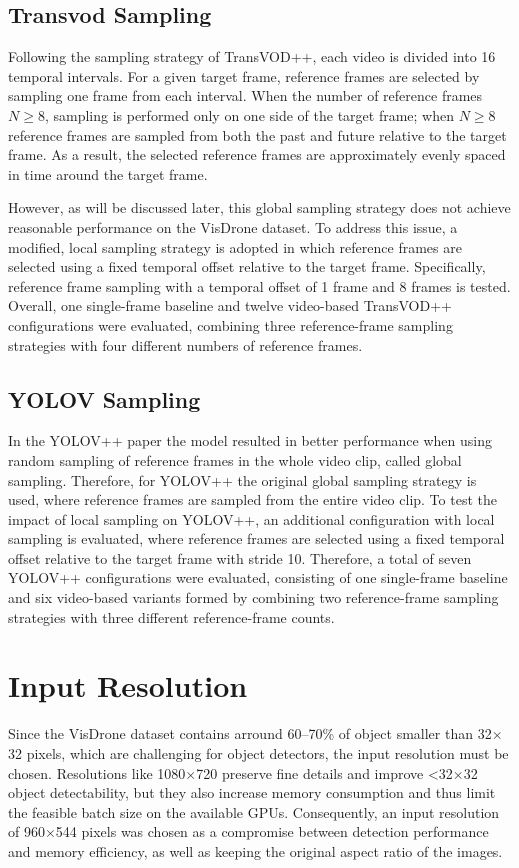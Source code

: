 \documentclass[final,twoside]{vutinfth}
\begin{document}
\subsection{Transvod Sampling}
Following the sampling strategy of TransVOD++, each video is divided into 16 temporal intervals. 
For a given target frame, reference frames are selected by sampling one frame from each interval. 
When the number of reference frames $N\geq8$, sampling is performed only on one side of the target frame; when $N\geq8$ reference frames are sampled from both the past and future relative to the target frame.
As a result, the selected reference frames are approximately evenly spaced in time around the target frame.

However, as will be discussed later, this global sampling strategy does not achieve reasonable performance on the VisDrone dataset.
To address this issue, a modified, local sampling strategy is adopted in which reference frames are selected using a fixed temporal offset relative to the target frame.
Specifically, reference frame sampling with a temporal offset of 1 frame and 8 frames is tested.
Overall, one single-frame baseline and twelve video-based TransVOD++ configurations were evaluated, combining three reference-frame sampling strategies with four different numbers of reference frames.
\subsection{YOLOV Sampling}
In the YOLOV++ paper the model resulted in better performance when using random sampling of reference frames in the whole video clip, called global sampling.
Therefore, for YOLOV++ the original global sampling strategy is used, where reference frames are sampled from the entire video clip.
To test the impact of local sampling on YOLOV++, an additional configuration with local sampling is evaluated, where reference frames are selected using a fixed temporal offset relative to the target frame with stride 10.
Therefore, a total of seven YOLOV++ configurations were evaluated, consisting of one single-frame baseline and six video-based variants formed by combining two reference-frame sampling strategies with three different reference-frame counts.


\section{Input Resolution}
Since the VisDrone dataset contains arround 60--70\% of object smaller than 32$\times$32 pixels, which are challenging for object detectors, the input resolution must be chosen. Resolutions like 1080$\times$720 preserve fine details and improve <32$\times$32 object detectability, but they also increase memory consumption and thus limit the feasible batch size on the available GPUs. 
Consequently, an input resolution of 960$\times$544 pixels was chosen as a compromise between detection performance and memory efficiency, as well as keeping the original aspect ratio of the images.
\end{document}
